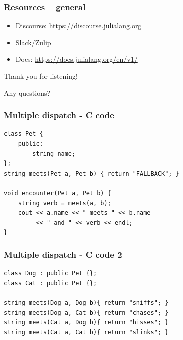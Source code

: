 \documentclass{beamer}
\begin{document}
\begin{frame}
    \frametitle{Resources -- general}
    \begin{itemize}
        \item Discourse: \url{https://discourse.julialang.org}
        \item Slack/Zulip
        \item Docs: \url{https://docs.julialang.org/en/v1/}
    \end{itemize}
\end{frame}

\begin{frame}
	\nocite{*}
	\printbibliography
\end{frame}


\begin{frame}
	\begin{center}
		\huge{Thank you for listening!}

		\small{Any questions?}
	\end{center}
\end{frame}


\appendix

\begin{frame}[fragile]
    \frametitle{Multiple dispatch - C code}

\begin{verbatim}
class Pet {
    public:
        string name;
};
string meets(Pet a, Pet b) { return "FALLBACK"; }

void encounter(Pet a, Pet b) {
    string verb = meets(a, b);
    cout << a.name << " meets " << b.name
         << " and " << verb << endl;
}
\end{verbatim}

\end{frame}


\begin{frame}[fragile]
    \frametitle{Multiple dispatch - C code 2}

\begin{verbatim}
class Dog : public Pet {};
class Cat : public Pet {};

string meets(Dog a, Dog b){ return "sniffs"; }
string meets(Dog a, Cat b){ return "chases"; }
string meets(Cat a, Dog b){ return "hisses"; }
string meets(Cat a, Cat b){ return "slinks"; }
\end{verbatim}

\end{frame}
\end{document}
